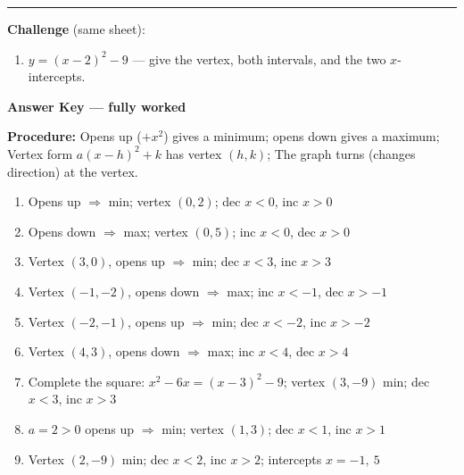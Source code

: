 \documentclass[12pt]{article}
\begin{document}
\vspace{0.2cm}\hrule\vspace{0.3cm}
\textbf{Challenge} (same sheet):\\[4pt]
\begin{enumerate}[label=\textbf{\arabic*.}, start=9, itemsep=2.2cm]
  \item $y=(x-2)^{2}-9$ --- give the vertex, both intervals, and the two $x$-intercepts.
\end{enumerate}

\newpage

\begin{center}{\Large \textbf{Answer Key --- fully worked}}\end{center}
\vspace{0.25cm}
\textbf{Procedure:} Opens up ($+x^{2}$) gives a minimum; opens down gives a maximum; Vertex form $a(x-h)^{2}+k$ has vertex $(h,k)$; The graph turns (changes direction) at the vertex.\\[8pt]
\begin{enumerate}[label=\textbf{\arabic*.},itemsep=7pt]
  \item Opens up $\Rightarrow$ min; vertex $(0,2)$; dec $x<0$, inc $x>0$
  \item Opens down $\Rightarrow$ max; vertex $(0,5)$; inc $x<0$, dec $x>0$
  \item Vertex $(3,0)$, opens up $\Rightarrow$ min; dec $x<3$, inc $x>3$
  \item Vertex $(-1,-2)$, opens down $\Rightarrow$ max; inc $x<-1$, dec $x>-1$
  \item Vertex $(-2,-1)$, opens up $\Rightarrow$ min; dec $x<-2$, inc $x>-2$
  \item Vertex $(4,3)$, opens down $\Rightarrow$ max; inc $x<4$, dec $x>4$
  \item Complete the square: $x^{2}-6x=(x-3)^{2}-9$; vertex $(3,-9)$ min; dec $x<3$, inc $x>3$
  \item $a=2>0$ opens up $\Rightarrow$ min; vertex $(1,3)$; dec $x<1$, inc $x>1$
  \item Vertex $(2,-9)$ min; dec $x<2$, inc $x>2$; intercepts $x=-1,\ 5$
\end{enumerate}
\end{document}

